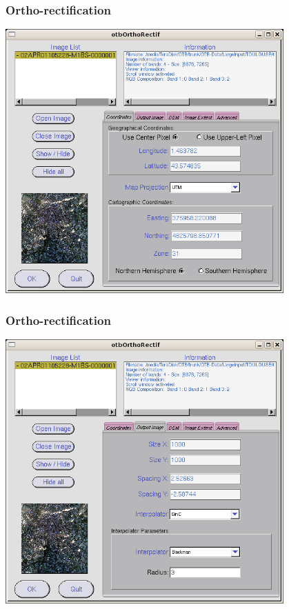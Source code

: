 \documentclass[compress]{beamer}
\begin{document}
\begin{frame}
  \frametitle{Ortho-rectification}
      \begin{center}
      \includegraphics[width=0.80\textwidth]{Images/ortho1.png}
  \end{center}
\end{frame}

\begin{frame}
  \frametitle{Ortho-rectification}
      \begin{center}
      \includegraphics[width=0.80\textwidth]{Images/ortho2.png}
  \end{center}
\end{frame}
\end{document}
